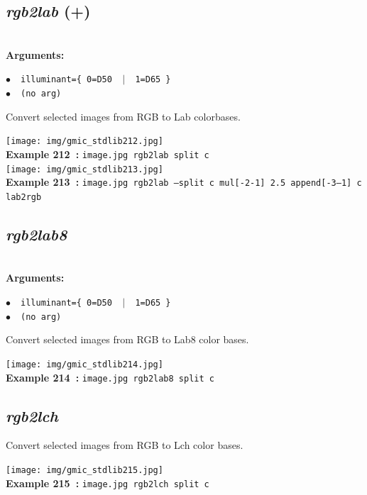\documentclass[a4paper,10.5pt,twoside]{book}
\def\comma{\discretionary{,}{}{,}}
\newcommand{\Cb}[1]{\textcolor{cb}{#1}}
\begin{document}
\subsection{\emph{rgb2lab} (+)}\vspace*{-0.7em}
~\\\textbf{\Cb{Arguments: }}\begin{flushleft}
{\small \Cb{\hspace*{0.5cm}$\bullet$~~\texttt{illuminant=\{ 0=D50 ~$|$~ 1=D65 \}}}}~~~\\
{\small \Cb{\hspace*{0.5cm}$\bullet$~~\texttt{(no arg)}}}\end{flushleft}
Convert selected images from RGB to Lab colorbases.
\begin{center}\texttt{[image: img/gmic\_stdlib212.jpg]}\\
{\footnotesize \textbf{Example 212~:} \texttt{image.jpg rgb2lab split c}}
\\\texttt{[image: img/gmic\_stdlib213.jpg]}\\
{\footnotesize \textbf{Example 213~:} \texttt{image.jpg rgb2lab --split c mul[-2{\comma}-1] 2.5 append[-3--1] c lab2rgb}}
\end{center}

\subsection{\emph{rgb2lab8} }\vspace*{-0.7em}
~\\\textbf{\Cb{Arguments: }}\begin{flushleft}
{\small \Cb{\hspace*{0.5cm}$\bullet$~~\texttt{illuminant=\{ 0=D50 ~$|$~ 1=D65 \}}}}~~~\\
{\small \Cb{\hspace*{0.5cm}$\bullet$~~\texttt{(no arg)}}}\end{flushleft}
Convert selected images from RGB to Lab8 color bases.
\begin{center}\texttt{[image: img/gmic\_stdlib214.jpg]}\\
{\footnotesize \textbf{Example 214~:} \texttt{image.jpg rgb2lab8 split c}}
\end{center}

\subsection{\emph{rgb2lch} }\vspace*{-0.7em}
Convert selected images from RGB to Lch color bases.
\begin{center}\texttt{[image: img/gmic\_stdlib215.jpg]}\\
{\footnotesize \textbf{Example 215~:} \texttt{image.jpg rgb2lch split c}}
\end{center}
\end{document}
